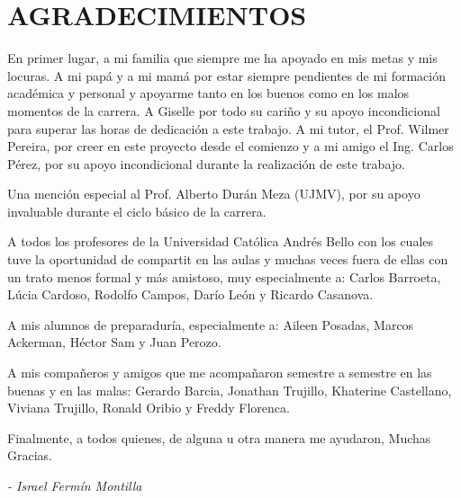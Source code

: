 \chapter*{AGRADECIMIENTOS}

En primer lugar, a mi familia que siempre me ha apoyado en mis metas y mis locuras. A mi papá y a mi mamá por estar siempre pendientes de mi formación académica y personal y apoyarme tanto en los buenos como en los malos momentos de la carrera. A Giselle por todo su cariño y su apoyo incondicional para superar las horas de dedicación a este trabajo. A mi tutor, el Prof. Wilmer Pereira, por creer en este proyecto desde el comienzo y a mi amigo el Ing. Carlos Pérez, por su apoyo incondicional durante la realización de este trabajo.

Una mención especial al Prof. Alberto Durán Meza (UJMV), por su apoyo invaluable durante el ciclo básico de la carrera.

A todos los profesores de la Universidad Católica Andrés Bello con los cuales tuve la oportunidad de compartit en las aulas y muchas veces fuera de ellas con un trato menos formal y más amistoso, muy especialmente a: Carlos Barroeta, Lúcia Cardoso, Rodolfo Campos, Darío León y Ricardo Casanova. 

A mis alumnos de preparaduría, especialmente a: Aileen Posadas, Marcos Ackerman, Héctor Sam y Juan Perozo.

A mis compañeros y amigos que me acompañaron semestre a semestre en las buenas y en las malas: Gerardo Barcia, Jonathan Trujillo, Khaterine Castellano, Viviana Trujillo, Ronald Oribio y Freddy Florenca.

Finalmente, a todos quienes, de alguna u otra manera me ayudaron,
Muchas Gracias.

\begin{flushright}
\textit{- Israel Fermín Montilla}
\end{flushright}
